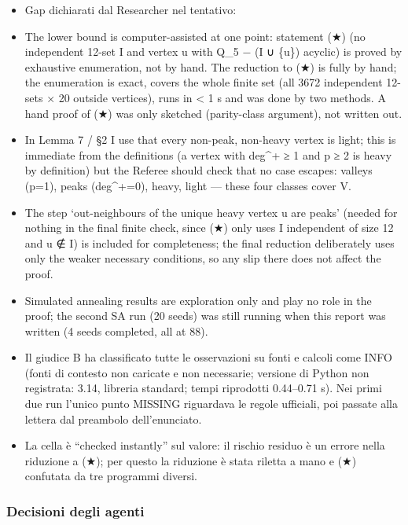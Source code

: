 \documentclass[11pt,a4paper]{article}
\providecommand{\tightlist}{\setlength{\itemsep}{0pt}\setlength{\parskip}{0pt}}
\begin{document}
\begin{itemize}
\tightlist
\item
  Gap dichiarati dal Researcher nel tentativo:
\item
  The lower bound is computer-assisted at one point: statement (★) (no
  independent 12-set I and vertex u with Q\_5 − (I ∪ \{u\}) acyclic) is
  proved by exhaustive enumeration, not by hand. The reduction to (★) is
  fully by hand; the enumeration is exact, covers the whole finite set
  (all 3672 independent 12-sets × 20 outside vertices), runs in
  \textless{} 1 s and was done by two methods. A hand proof of (★) was
  only sketched (parity-class argument), not written out.
\item
  In Lemma 7 / §2 I use that every non-peak, non-heavy vertex is light;
  this is immediate from the definitions (a vertex with deg\^{}+ ≥ 1 and
  p ≥ 2 is heavy by definition) but the Referee should check that no
  case escapes: valleys (p=1), peaks (deg\^{}+=0), heavy, light ---
  these four classes cover V.
\item
  The step `out-neighbours of the unique heavy vertex u are peaks'
  (needed for nothing in the final finite check, since (★) only uses I
  independent of size 12 and u ∉ I) is included for completeness; the
  final reduction deliberately uses only the weaker necessary
  conditions, so any slip there does not affect the proof.
\item
  Simulated annealing results are exploration only and play no role in
  the proof; the second SA run (20 seeds) was still running when this
  report was written (4 seeds completed, all at 88).
\item
  Il giudice B ha classificato tutte le osservazioni su fonti e calcoli
  come INFO (fonti di contesto non caricate e non necessarie; versione
  di Python non registrata: 3.14, libreria standard; tempi riprodotti
  0.44--0.71 s). Nei primi due run l'unico punto MISSING riguardava le
  regole ufficiali, poi passate alla lettera dal preambolo
  dell'enunciato.
\item
  La cella è ``checked instantly'' sul valore: il rischio residuo è un
  errore nella riduzione a (★); per questo la riduzione è stata riletta
  a mano e (★) confutata da tre programmi diversi.
\end{itemize}

\subsubsection{Decisioni degli agenti}
\end{document}
